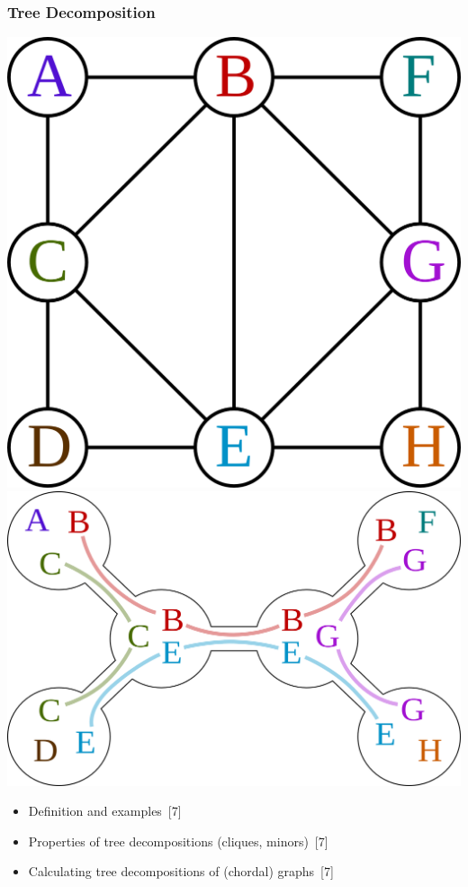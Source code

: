 \documentclass[titlepage,german,presentation]{beamer}
\begin{document}
\begin{frame}
\frametitle{Tree Decomposition}

\begin{center}
\includegraphics[height=0.37\textheight]{my_tree_3.png}\qquad
\includegraphics[height=0.37\textheight]{my_tree_4.png}
\end{center}

\begin{itemize}
\item Definition and examples~[7]
\medskip
\item Properties of tree decompositions (cliques, minors)~[7]
\medskip
\item Calculating tree decompositions of (chordal) graphs~[7]
\end{itemize}

\end{frame}
\end{document}
